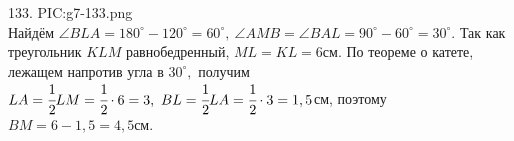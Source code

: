 133. {{PIC:g7-133.png}}\\
Найдём $\angle BLA=180^\circ-120^\circ=60^\circ,\ \angle AMB=\angle BAL=90^\circ-60^\circ=30^\circ.$ Так как треугольник $KLM$ равнобедренный, $ML=KL=6$см. По теореме о катете, лежащем напротив угла в $30^\circ,$ получим $LA=\cfrac{1}{2}LM=\cfrac{1}{2}\cdot6=3,\ BL=\cfrac{1}{2}LA=\cfrac{1}{2}\cdot3=1,5$см, поэтому $BM=6-1,5=4,5$см.\\
